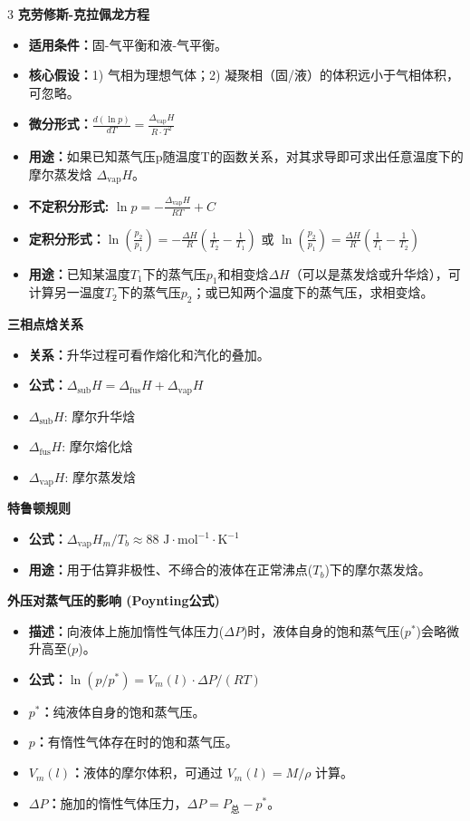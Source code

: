 \documentclass[a4paper,6pt]{article} %
\begin{document}
\begin{multicols}{3}
\textbf{克劳修斯-克拉佩龙方程}
\begin{itemize}
    \item \textbf{适用条件：}固-气平衡和液-气平衡。
    \item \textbf{核心假设：}1) 气相为理想气体；2) 凝聚相（固/液）的体积远小于气相体积，可忽略。
    \item \textbf{微分形式：}$\frac{d(\ln p)}{dT} = \frac{\Delta_{\text{vap}}H}{R \cdot T^2}$
    \item \textbf{用途：}如果已知蒸气压p随温度T的函数关系，对其求导即可求出任意温度下的摩尔蒸发焓 $\Delta_{\text{vap}}H$。
    \item \textbf{不定积分形式:} $\ln p = - \frac{\Delta_{\text{vap}}H}{RT} + C$
    \item \textbf{定积分形式：}$\ln\left(\frac{p_2}{p_1}\right) = - \frac{\Delta H}{R} \left(\frac{1}{T_2} - \frac{1}{T_1}\right)$ 或 $\ln\left(\frac{p_2}{p_1}\right) = \frac{\Delta H}{R} \left(\frac{1}{T_1} - \frac{1}{T_2}\right)$
    \item \textbf{用途：}已知某温度$T_1$下的蒸气压$p_1$和相变焓$\Delta H$（可以是蒸发焓或升华焓），可计算另一温度$T_2$下的蒸气压$p_2$；或已知两个温度下的蒸气压，求相变焓。
\end{itemize}

\textbf{三相点焓关系}
\begin{itemize}
    \item \textbf{关系：}升华过程可看作熔化和汽化的叠加。
    \item \textbf{公式：}$\Delta_{\text{sub}}H = \Delta_{\text{fus}}H + \Delta_{\text{vap}}H$
    \item $\Delta_{\text{sub}}H$: 摩尔升华焓
    \item $\Delta_{\text{fus}}H$: 摩尔熔化焓
    \item $\Delta_{\text{vap}}H$: 摩尔蒸发焓
\end{itemize}

\textbf{特鲁顿规则}
\begin{itemize}
    \item \textbf{公式：}$\Delta_{\text{vap}}H_m / T_b \approx 88 \text{ J}\cdot\text{mol}^{-1}\cdot\text{K}^{-1}$
    \item \textbf{用途：}用于估算非极性、不缔合的液体在正常沸点($T_b$)下的摩尔蒸发焓。
\end{itemize}

\textbf{外压对蒸气压的影响 (Poynting公式)}
\begin{itemize}
    \item \textbf{描述：}向液体上施加惰性气体压力($\Delta P$)时，液体自身的饱和蒸气压($p^*$)会略微升高至($p$)。
    \item \textbf{公式：}$\ln(p / p^*) = V_m(l) \cdot \Delta P / (RT)$
    \item \textbf{$p^*$：}纯液体自身的饱和蒸气压。
    \item \textbf{$p$：}有惰性气体存在时的饱和蒸气压。
    \item \textbf{$V_m(l)$：}液体的摩尔体积，可通过 $V_m(l) = M / \rho$ 计算。
    \item \textbf{$\Delta P$：}施加的惰性气体压力，$\Delta P = P_{\text{总}} - p^*$。
\end{itemize}


\end{multicols}
\end{document}
